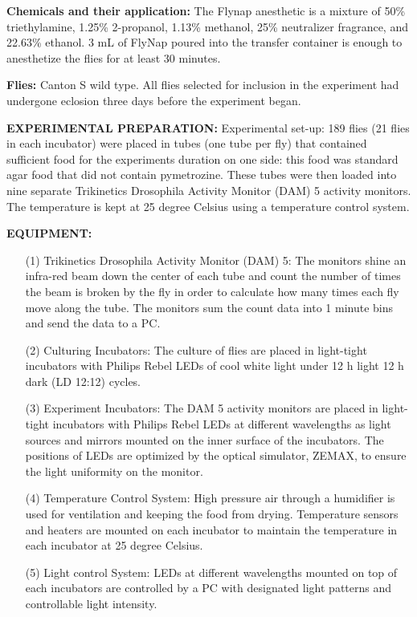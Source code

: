 \documentclass[11pt, onecolumn]{IEEEtran}
\begin{document}
\textbf{Chemicals and their application:}
The Flynap anesthetic is a mixture of 50\% triethylamine, 1.25\% 2-propanol, 1.13\% methanol, 25\% neutralizer fragrance, and 22.63\% ethanol. 3 mL of FlyNap poured into the transfer container is enough to anesthetize the flies for at least 30 minutes.

\textbf{Flies:} Canton S wild type. All flies selected for inclusion in the experiment had undergone eclosion three days before the experiment began. 

\medskip

\textbf{EXPERIMENTAL PREPARATION:}
Experimental set-up: 189 flies (21 flies in each incubator) were placed in tubes (one tube per fly) that contained sufficient food for the experiments duration on one side: this food was standard agar food that did not contain pymetrozine. These tubes were then loaded into nine separate Trikinetics Drosophila Activity Monitor (DAM) 5 activity monitors. The temperature is kept at 25 degree Celsius using a temperature control system.

\medskip
\textbf{EQUIPMENT:}

\begin{itemize}
\item[(1)] Trikinetics Drosophila Activity Monitor (DAM) 5: The monitors shine an infra-red beam down the center of each tube and count the number of times the beam is broken by the fly in order to calculate how many times each fly move along the tube. The monitors sum the count data into 1 minute bins and send the data to a PC.\\
\item[(2)] Culturing Incubators: The culture of flies are placed in light-tight incubators with Philips Rebel LEDs of cool white light under 12 h light 12 h dark (LD 12:12) cycles. \\
\item[(3)] Experiment Incubators: The DAM 5 activity monitors are placed in light-tight incubators with Philips Rebel LEDs at different wavelengths as light sources and mirrors mounted on the inner surface of the incubators. The positions of LEDs are optimized by the optical simulator, ZEMAX, to ensure the light uniformity on the monitor.\\
\item[(4)] Temperature Control System: High pressure air through a humidifier is used for ventilation and keeping the food from drying. Temperature sensors and heaters are mounted on each incubator to maintain the temperature in each incubator at 25 degree Celsius.\\
\item[(5)] Light control System: LEDs at different wavelengths mounted on top of each incubators are controlled by a PC with designated light patterns and controllable light intensity.
\end{itemize}
\end{document}
